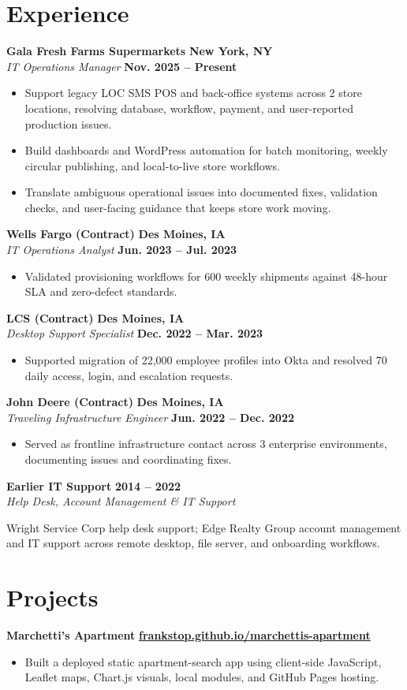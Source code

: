 \documentclass[10pt,letterpaper]{article}
\newcommand{\resumeRole}[4]{
  \textbf{#1} \hfill \textbf{#2}\\
  \textit{#3} \hfill \textbf{#4}
}
\newcommand{\resumeCompactRole}[3]{
  \textbf{#1} \hfill \textbf{#2}\\
  \textit{#3}
}
\begin{document}
\section*{Experience}
\resumeRole{Gala Fresh Farms Supermarkets}{New York, NY}{IT Operations Manager}{Nov. 2025 -- Present}
\begin{itemize}
  \item Support legacy LOC SMS POS and back-office systems across 2 store locations, resolving database, workflow, payment, and user-reported production issues.
  \item Build dashboards and WordPress automation for batch monitoring, weekly circular publishing, and local-to-live store workflows.
  \item Translate ambiguous operational issues into documented fixes, validation checks, and user-facing guidance that keeps store work moving.
\end{itemize}

\resumeRole{Wells Fargo (Contract)}{Des Moines, IA}{IT Operations Analyst}{Jun. 2023 -- Jul. 2023}
\begin{itemize}
  \item Validated provisioning workflows for 600 weekly shipments against 48-hour SLA and zero-defect standards.
\end{itemize}

\resumeRole{LCS (Contract)}{Des Moines, IA}{Desktop Support Specialist}{Dec. 2022 -- Mar. 2023}
\begin{itemize}
  \item Supported migration of 22,000 employee profiles into Okta and resolved 70 daily access, login, and escalation requests.
\end{itemize}

\resumeRole{John Deere (Contract)}{Des Moines, IA}{Traveling Infrastructure Engineer}{Jun. 2022 -- Dec. 2022}
\begin{itemize}
  \item Served as frontline infrastructure contact across 3 enterprise environments, documenting issues and coordinating fixes.
\end{itemize}

\resumeCompactRole{Earlier IT Support}{2014 -- 2022}{Help Desk, Account Management \& IT Support}
Wright Service Corp help desk support; Edge Realty Group account management and IT support across remote desktop, file server, and onboarding workflows.

\section*{Projects}
\textbf{Marchetti's Apartment} \hfill \href{https://frankstop.github.io/marchettis-apartment/}{\textbf{frankstop.github.io/marchettis-apartment}}
\begin{itemize}
  \item Built a deployed static apartment-search app using client-side JavaScript, Leaflet maps, Chart.js visuals, local modules, and GitHub Pages hosting.
\end{itemize}
\end{document}
